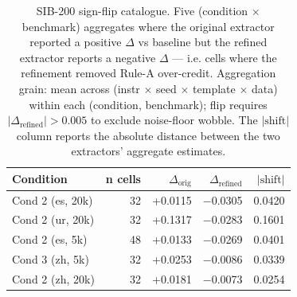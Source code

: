 \begin{table}[t]
  \centering
  \small
  \begin{tabular}{lrrrr}
    \toprule
    Condition & n cells & $\Delta_{\text{orig}}$ & $\Delta_{\text{refined}}$ & $|\text{shift}|$ \\
    \midrule
    Cond 2 (es, 20k) & 32 & +0.0115 & $-$0.0305 & 0.0420 \\
    Cond 2 (ur, 20k) & 32 & +0.1317 & $-$0.0283 & 0.1601 \\
    Cond 2 (es, 5k) & 48 & +0.0133 & $-$0.0269 & 0.0401 \\
    Cond 3 (zh, 5k) & 32 & +0.0253 & $-$0.0086 & 0.0339 \\
    Cond 2 (zh, 20k) & 32 & +0.0181 & $-$0.0073 & 0.0254 \\
    \bottomrule
  \end{tabular}
  \caption{\textsc{SIB-200} sign-flip catalogue. Five (condition $\times$ benchmark) aggregates where the original extractor reported a positive $\Delta$ vs baseline but the refined extractor reports a negative $\Delta$ --- i.e. cells where the refinement removed Rule-A over-credit. Aggregation grain: mean across (instr $\times$ seed $\times$ template $\times$ data) within each (condition, benchmark); flip requires $|\Delta_{\text{refined}}| > 0.005$ to exclude noise-floor wobble. The $|\text{shift}|$ column reports the absolute distance between the two extractors' aggregate estimates.}
  \label{tab:sib200-sign-flips}
\end{table}
